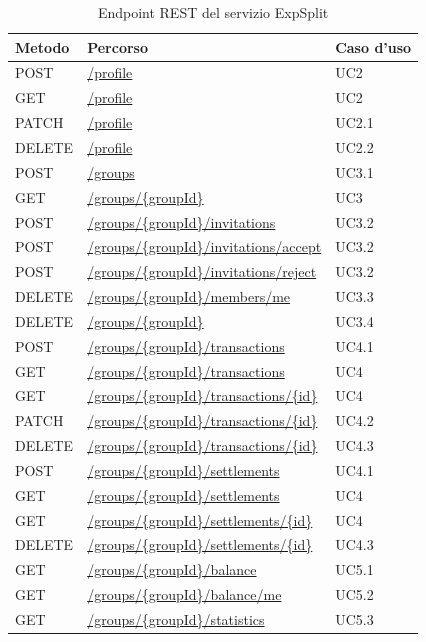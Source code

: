 \begin{table}[H]
    \centering
    \begin{tabular}{lll}
        \hline
        \textbf{Metodo} & \textbf{Percorso} & \textbf{Caso d'uso} \\
        \hline
        POST & \url{/profile} & UC2 \\
        GET & \url{/profile} & UC2 \\
        PATCH & \url{/profile} & UC2.1 \\
        DELETE & \url{/profile} & UC2.2 \\
        \hline
        POST & \url{/groups} & UC3.1 \\
        GET & \url{/groups/{groupId}} & UC3 \\
        POST & \url{/groups/{groupId}/invitations} & UC3.2 \\
        POST & \url{/groups/{groupId}/invitations/accept} & UC3.2 \\
        POST & \url{/groups/{groupId}/invitations/reject} & UC3.2 \\
        DELETE & \url{/groups/{groupId}/members/me} & UC3.3 \\
        DELETE & \url{/groups/{groupId}} & UC3.4 \\
        \hline
        POST & \url{/groups/{groupId}/transactions} & UC4.1 \\
        GET & \url{/groups/{groupId}/transactions} & UC4 \\
        GET & \url{/groups/{groupId}/transactions/{id}} & UC4 \\
        PATCH & \url{/groups/{groupId}/transactions/{id}} & UC4.2 \\
        DELETE & \url{/groups/{groupId}/transactions/{id}} & UC4.3 \\
        \hline
        POST & \url{/groups/{groupId}/settlements} & UC4.1 \\
        GET & \url{/groups/{groupId}/settlements} & UC4 \\
        GET & \url{/groups/{groupId}/settlements/{id}} & UC4 \\
        DELETE & \url{/groups/{groupId}/settlements/{id}} & UC4.3 \\
        \hline
        GET & \url{/groups/{groupId}/balance} & UC5.1 \\
        GET & \url{/groups/{groupId}/balance/me} & UC5.2 \\
        GET & \url{/groups/{groupId}/statistics} & UC5.3 \\
        \hline
    \end{tabular}
    \caption{Endpoint REST del servizio ExpSplit}
    \label{tab:expsplit-endpoints}
\end{table}

